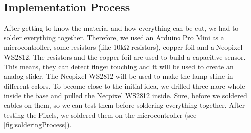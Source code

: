 \documentclass[doc.tex]{subfiles}
\begin{document}
    \subsection{Implementation Process}
    \begin{flushleft}
        After getting to know the material and how everything can be cut, we had to 
        solder everything together. Therefore, we used an Arduino Pro Mini \cite{arduinoProMini} 
        as a microcontroller, some resistors (like 10k\si{\ohm} resistors), copper foil and a Neopixel WS2812. \newline
        The resistors and the copper foil are used to build a capacitive sensor. \cite{Badger2019} 
        This means, they can detect finger touching and it will be used to create an analog slider.
        The Neopixel WS2812 will be used to make the lamp shine in different colors. \cite{Burgess2019} 
        \newline 
        \noindent
        To become close to the initial idea, we drilled three more whole inside the base and 
        pulled the Neopixel WS2812 inside. Sure, before we soldered cables on them, so we can 
        test them before soldering everything together. After testing the Pixels, we soldered 
        them on the microcontroller (see \ref{fig:solderingProcess}).
    \end{flushleft}
\end{document}
